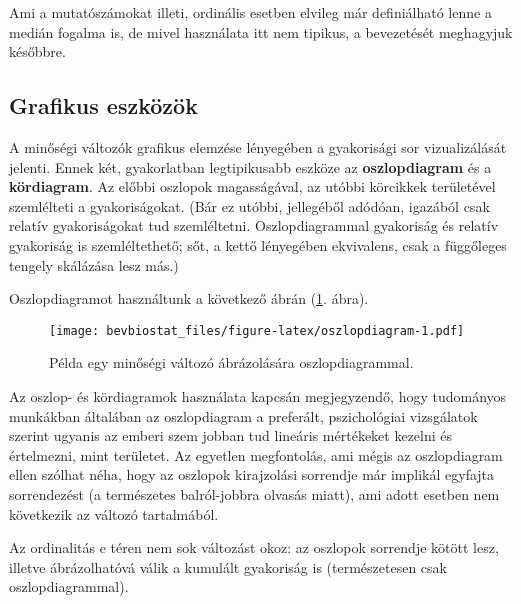 \documentclass[]{book}
\newenvironment{Shaded}{\begin{snugshade}}{\end{snugshade}}
\newcommand{\KeywordTok}[1]{\textcolor[rgb]{0.13,0.29,0.53}{\textbf{#1}}}
\newcommand{\OperatorTok}[1]{\textcolor[rgb]{0.81,0.36,0.00}{\textbf{#1}}}
\newcommand{\NormalTok}[1]{#1}
\begin{document}
Ami a mutatószámokat illeti, ordinális esetben elvileg már definiálható
lenne a medián fogalma is, de mivel használata itt nem tipikus, a
bevezetését meghagyjuk későbbre.

\subsection{Grafikus eszközök}\label{deskriptivminegyvaltgrafikus}

A minőségi változók grafikus elemzése lényegében a gyakorisági sor
vizualizálását jelenti. Ennek két, gyakorlatban legtipikusabb eszköze az
\textbf{oszlopdiagram} és a \textbf{kördiagram}. Az előbbi oszlopok
magasságával, az utóbbi körcikkek területével szemlélteti a
gyakoriságokat. (Bár ez utóbbi, jellegéből adódóan, igazából csak
relatív gyakoriságokat tud szemléltetni. Oszlopdiagrammal gyakoriság és
relatív gyakoriság is szemléltethető; sőt, a kettő lényegében
ekvivalens, csak a függőleges tengely skálázása lesz más.)

Oszlopdiagramot használtunk a következő ábrán (\ref{fig:oszlopdiagram}.
ábra).

\begin{Shaded}
\end{Shaded}

\begin{figure}
\centering
\texttt{[image: bevbiostat\_files/figure-latex/oszlopdiagram-1.pdf]}
\caption{\label{fig:oszlopdiagram}Példa egy minőségi változó ábrázolására
oszlopdiagrammal.}
\end{figure}

Az oszlop- és kördiagramok használata kapcsán megjegyzendő, hogy
tudományos munkákban általában az oszlopdiagram a preferált,
pszichológiai vizsgálatok szerint ugyanis az emberi szem jobban tud
lineáris mértékeket kezelni és értelmezni, mint területet. Az egyetlen
megfontolás, ami mégis az oszlopdiagram ellen szólhat néha, hogy az
oszlopok kirajzolási sorrendje már implikál egyfajta sorrendezést (a
természetes balról-jobbra olvasás miatt), ami adott esetben nem
következik az változó tartalmából.

Az ordinalitás e téren nem sok változást okoz: az oszlopok sorrendje
kötött lesz, illetve ábrázolhatóvá válik a kumulált gyakoriság is
(természetesen csak oszlopdiagrammal).
\end{document}
